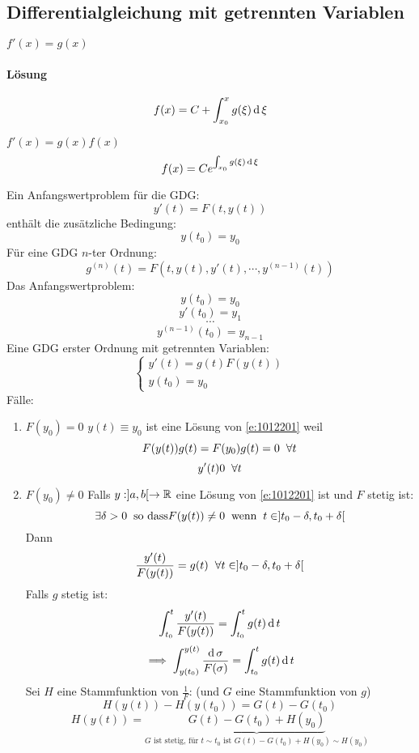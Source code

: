\subsection{Differentialgleichung mit getrennten Variablen}
\begin{Bem}
  $f'(x)=g(x)$
  \paragraph{Lösung}
  \[f(x)=C+\int_{x_0}^xg(\xi)\operatorname{d} \xi\]
\end{Bem}
\begin{Bem}
  $f'(x)=g(x)f(x)$
  \[f(x)=Ce^{\int_{x_0}g(\xi)\operatorname{d} \xi}\]
\end{Bem}
\begin{Def}
  Ein Anfangswertproblem für die GDG:
  \[y'(t)=F(t,y(t))\]
  enthält die zusätzliche Bedingung:
  \[y(t_0)=y_0\]
  Für eine GDG $n$-ter Ordnung:
  \[g^{(n)}(t)=F(t,y(t),y'(t),\cdots,y^{(n-1)}(t))\]
  Das Anfangswertproblem:
  \[y(t_0)=y_0\]
  \[y'(t_0)=y_1\]
  \[\cdots\]
  \[y^{(n-1)}(t_0)=y_{n-1}\]
  Eine GDG erster Ordnung mit getrennten Variablen:
  \begin{equation}
    \label{e:1012201}
    \begin{cases}
      y'(t)=g(t)F(y(t))\\
      y(t_0)=y_0
    \end{cases}
  \end{equation}
  Fälle:
  \begin{enumerate}
    \item $F(y_0)=0$ $y(t)\equiv y_0$ ist eine Lösung von \ref{e:1012201} weil
      \[F(y(t))g(t)=F(y_0)g(t)=0\hspace{2mm}\forall t\]
      \[y'(t)0\hspace{2mm}\forall t\]
    \item $F(y_0)\neq 0$
      Falls $y:]a,b[\to\mathbb{R}$ eine Lösung von \ref{e:1012201} ist und $F$ stetig ist:
      \[\exists \delta>0\hspace{2mm}\text{so dass} F(y(t))\neq 0\hspace{2mm}\text{wenn}\hspace{2mm} t\in]t_0-\delta,t_0+\delta[\]
      Dann
      \[\frac{y'(t)}{F(y(t))}=g(t)\hspace{2mm}\forall t\in ]t_0-\delta,t_0+\delta[\]
      Falls $g$ stetig ist:
      \[\int_{t_0}^t\frac{y'(t)}{F(y(t))}=\int_{t_0}^tg(t)\operatorname{d} t\]
      \[\implies \int_{y(t_0)}^{y(t)}\frac{\operatorname{d} \sigma}{F(\sigma)}=\int_{t_0}^tg(t)\operatorname{d} t\]
      Sei $H$ eine Stammfunktion von $\frac{1}{F}$: (und $G$ eine Stammfunktion von $g$)
      \[H(y(t))-H(y(t_0))=G(t)-G(t_0)\]
      \begin{equation}
        \label{e:1012202}
        H(y(t))=\underbrace{G(t)-G(t_0)+H(y_0)}_{\text{$G$ ist stetig, für $t\sim t_0$ ist $G(t)-G(t_0)+H(y_0)\sim H(y_0)$}}
      \end{equation}

\end{enumerate}
\end{Def}
